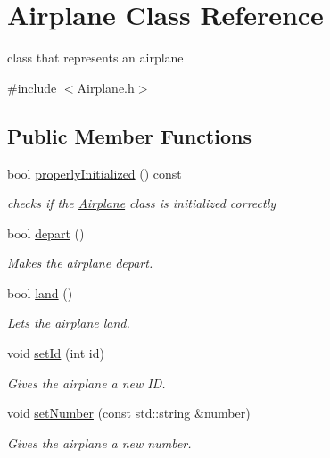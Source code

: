 \hypertarget{class_airplane}{}\section{Airplane Class Reference}
\label{class_airplane}


class that represents an airplane  




{\ttfamily \#include $<$Airplane.\+h$>$}

\subsection*{Public Member Functions}
\begin{DoxyCompactItemize}
\item 
bool \mbox{\hyperlink{class_airplane_a6f80df8f692cc8d67d292c1e9f26d59e}{properly\+Initialized}} () const
\begin{DoxyCompactList}\small\item\em checks if the \mbox{\hyperlink{class_airplane}{Airplane}} class is initialized correctly \end{DoxyCompactList}\item 
bool \mbox{\hyperlink{class_airplane_a1a3e3bea7add6690d6908393ecdda3f4}{depart}} ()
\begin{DoxyCompactList}\small\item\em Makes the airplane depart. \end{DoxyCompactList}\item 
bool \mbox{\hyperlink{class_airplane_acd9fe7c6dd10492f6a7995c3d2ddc8ac}{land}} ()
\begin{DoxyCompactList}\small\item\em Lets the airplane land. \end{DoxyCompactList}\item 
void \mbox{\hyperlink{class_airplane_ac71484f422e952d4cfe94d89b302dbc4}{set\+Id}} (int id)
\begin{DoxyCompactList}\small\item\em Gives the airplane a new ID. \end{DoxyCompactList}\item 
void \mbox{\hyperlink{class_airplane_af9bf0ea879bf7875b71f552ac9400da7}{set\+Number}} (const std\+::string \&number)
\begin{DoxyCompactList}\small\item\em Gives the airplane a new number. \end{DoxyCompactList}\item 

\end{DoxyCompactItemize}
